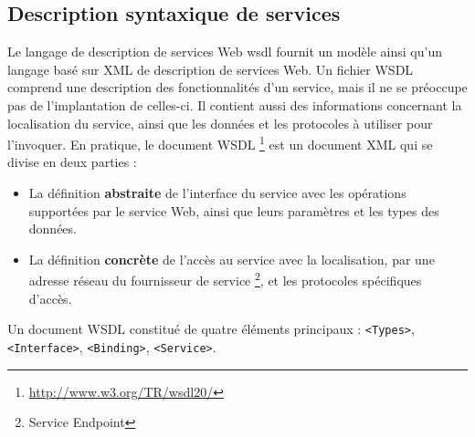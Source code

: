     	\subsection{Description syntaxique de services}
	 Le langage de description de services Web \acrshort{wsdl} \cite{chinnici2007web} fournit un modèle ainsi
	 qu'un langage basé sur \textsc{XML} de description de services Web.  Un fichier \textsc{WSDL} comprend une 
	 description des fonctionnalités d'un service, mais il ne se préoccupe pas de l'implantation de celles-ci. 
	 Il contient aussi des informations concernant la localisation du service, ainsi que les données et les 
	 protocoles à utiliser pour l'invoquer. En pratique, le document \textsc{WSDL}
	 \footnote{\url{http://www.w3.org/TR/wsdl20/}} est un document \textsc{XML} qui se divise en 
	 deux parties \cite{elie2010}:


       	 \SpecialItem 
	 \begin{itemize}  %
	    \item La définition \textbf{abstraite} de l'interface du service avec les opérations supportées par
		le service Web, ainsi que leurs paramètres et les types des données.

	    \item La définition \textbf{concrète} de l'accès au service avec la localisation, par une adresse
		réseau du fournisseur de service \footnote{Service Endpoint}, et les protocoles spécifiques d'accès.
	 \end{itemize}
	Un document \textsc{WSDL} constitué de quatre éléments principaux \cite{chinnici2007web}: 
	\texttt{<Types>}, \texttt{<Interface>}, \texttt{<Binding>}, \texttt{<Service>}.

